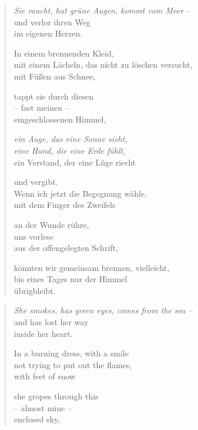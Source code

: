 
{\setlength{\stanzaskip}{0.6em}

\cleartoverso


\begin{verse}

\emph{Sie raucht, hat grüne Augen, kommt vom Meer} --\\
und verlor ihren Weg\\
im eigenen Herzen.

In einem brennenden Kleid,\\
mit einem Lächeln, das nicht zu löschen versucht,\\
mit Füßen aus Schnee,

tappt sie durch diesen\\
-- fast meinen --\\
eingeschlossenen Himmel,

\emph{ein Auge, das eine Sonne sieht,\\
eine Hand, die eine Erde fühlt,}\\
ein Verstand, der eine Lüge riecht

und vergibt.\\
Wenn ich jetzt die Begegnung wähle,\\
mit dem Finger des Zweifels

an der Wunde rühre,\\
uns vorlese\\
aus der offengelegten Schrift,

könnten wir gemeinsam brennen, vielleicht,\\
bis eines Tages nur der Himmel\\
übrigbleibt.

\end{verse}

\clearpage


\begin{verse}

\emph{She smokes, has green eyes, comes from the sea --}\label{marina-autobio}\\
and has lost her way\\
inside her heart.

In a burning dress, with a smile\\
not trying to put out the flames,\\
with feet of snow

she gropes through this\\
-- almost mine --\\
enclosed sky,


\end{verse}}
